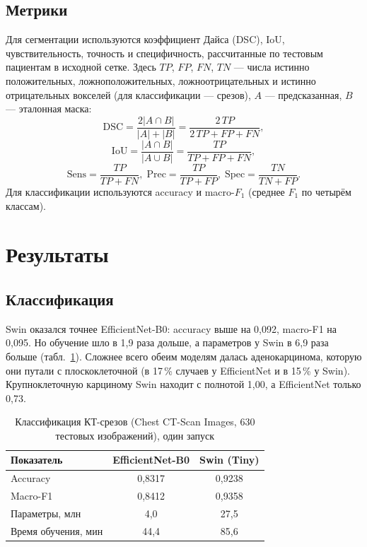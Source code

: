 \documentclass{misisarticle}
\begin{document}
\subsection{Метрики}
Для сегментации используются коэффициент Дайса (DSC), IoU, чувствительность, точность и специфичность, рассчитанные по тестовым пациентам в исходной сетке. Здесь $TP$, $FP$, $FN$, $TN$ — числа истинно положительных, ложноположительных, ложноотрицательных и истинно отрицательных вокселей (для классификации — срезов), $A$ — предсказанная, $B$ — эталонная маска:
\begin{equation}
\mathrm{DSC} = \frac{2|A \cap B|}{|A|+|B|} = \frac{2\,TP}{2\,TP+FP+FN},
\label{eq:dsc}
\end{equation}
\begin{equation}
\mathrm{IoU} = \frac{|A\cap B|}{|A\cup B|} = \frac{TP}{TP+FP+FN},
\end{equation}
\begin{equation}
\mathrm{Sens}=\frac{TP}{TP+FN},\;
\mathrm{Prec}=\frac{TP}{TP+FP},\;
\mathrm{Spec}=\frac{TN}{TN+FP}.
\end{equation}
Для классификации используются accuracy и macro-$F_1$ (среднее $F_1$ по четырём классам).

\section{Результаты}\label{sec:results}
\subsection{Классификация}\label{sec:cls}
Swin оказался точнее EfficientNet-B0: accuracy выше на 0,092, macro-F1 на 0,095. Но обучение шло в 1,9 раза дольше, а параметров у Swin в 6,9 раза больше (табл.~\ref{tab:cls}). Сложнее всего обеим моделям далась аденокарцинома, которую они путали с плоскоклеточной (в 17\,\% случаев у EfficientNet и в 15\,\% у Swin). Крупноклеточную карциному Swin находит с полнотой 1,00, а EfficientNet только 0,73.

\begin{table}[htbp]
\caption{Классификация КТ-срезов (Chest CT-Scan Images, 630 тестовых изображений), один запуск}
\centering\footnotesize
\begin{tabular}{lcc}
\toprule
Показатель & EfficientNet-B0 & Swin (Tiny)\\
\midrule
Accuracy & 0,8317 & 0,9238\\
Macro-F1 & 0,8412 & 0,9358\\
Параметры, млн & 4,0 & 27,5\\
Время обучения, мин & 44,4 & 85,6\\
\bottomrule
\end{tabular}
\label{tab:cls}
\end{table}
\end{document}

